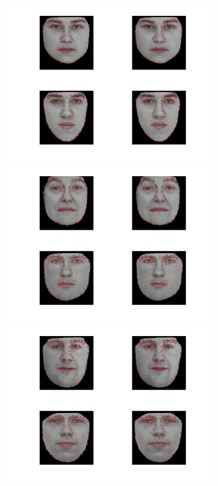 \documentclass[12pt]{ctexart}
\begin{document}
\begin{enumerate}
\begin{figure}[H]
\includegraphics[scale=0.18]{b_com_face_lm3.jpg}
\includegraphics[scale=0.18]{b_com_face_lm4.jpg}
\includegraphics[scale=0.18]{b_com_face_lm5.jpg}

\end{figure}
\end{enumerate}
\end{document}
